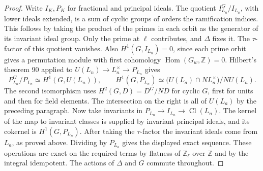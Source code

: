 \documentclass[a4paper,11pt]{article}
\theoremstyle{definition}
\theoremstyle{remark}
\newcommand{\ZZ}{\mathbb Z}\newcommand{\ord}{\operatorname{ord}}
\numberwithin{equation}{section}
\newcommand{\Cl}{\operatorname{Cl}}
\begin{document}
\begin{proof}
Write \(I_K,P_K\) for fractional and principal ideals.
The quotient \(I_{L_n}^G/I_{L_a}\), with lower ideals extended,
is a sum of cyclic groups of orders the ramification indices.
This follows by taking the product of the primes in each
orbit as the generator of its invariant ideal group. Only the
prime at \(\ell\) contributes, and \(\Delta\) fixes it. The
\(\tau\)-factor of this quotient vanishes. Also
\(H^1(G,I_{L_n})=0\), since each prime orbit gives a permutation
module with first cohomology \(\operatorname{Hom}(G_w,\ZZ)=0\).
Hilbert's theorem 90 applied to \(U(L_n)\to L_n^\times\to
P_{L_n}\) gives
\[
 P_{L_n}^G/P_{L_a}\simeq H^1(G,U(L_n)),\qquad
 H^1(G,P_{L_n})\simeq
       \bigl(U(L_a)\cap N L_n^\times\bigr)/N U(L_n).
\]
The second isomorphism uses \(H^2(G,D)=D^G/ND\) for cyclic
\(G\), first for units and then for field elements. The
intersection on the right is all of \(U(L_a)\) by the preceding
paragraph. Now take invariants in \(P_{L_n}\to I_{L_n}\to\Cl(L_n)\).
The kernel of the map to invariant classes is supplied by
invariant principal ideals, and its cokernel is \(H^1(G,P_{L_n})\).
After taking the \(\tau\)-factor the invariant ideals come from
\(L_a\), as proved above. Dividing by \(P_{L_a}\) gives the
displayed exact sequence. These operations are exact on the
required terms by flatness of \(\ZZ_\ell\) over \(\ZZ\) and
by the integral idempotent. The actions of \(\Delta\) and \(G\)
commute throughout.
\end{proof}
\end{document}
